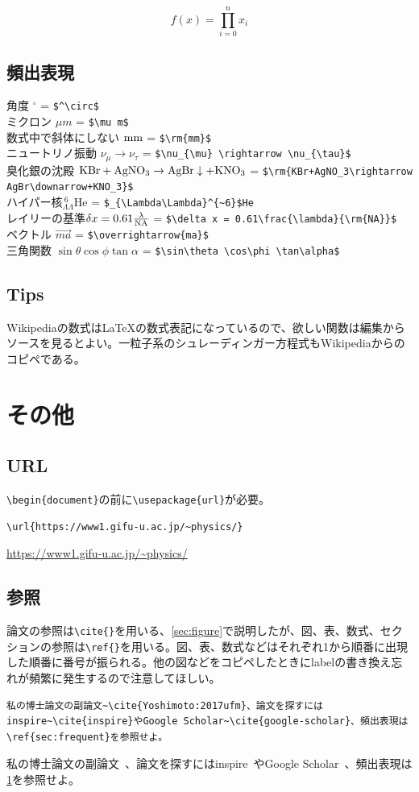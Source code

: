 \documentclass[a4j,openany,11px]{jsbook}
\begin{document}
\begin{equation}  f(x) = \prod_{i=0}^n x_i \end{equation}
\section{頻出表現}
\label{sec:frequent}
\noindent
角度 $^\circ$ = \verb|$^\circ$|\\
ミクロン $\mu m$ = \verb|$\mu m$|\\
数式中で斜体にしない $\rm{mm}$ = \verb|$\rm{mm}$|\\
ニュートリノ振動 $\nu_{\mu} \rightarrow \nu_{\tau}$ = \verb|$\nu_{\mu} \rightarrow \nu_{\tau}$|\\
臭化銀の沈殿 $\rm{KBr+AgNO_3\rightarrow AgBr\downarrow+KNO_3}$ = \verb|$\rm{KBr+AgNO_3\rightarrow AgBr\downarrow+KNO_3}$|\\
ハイパー核$_{\Lambda\Lambda}^{~6}$He = \verb|$_{\Lambda\Lambda}^{~6}$He|\\
レイリーの基準$\delta x = 0.61\frac{\lambda}{\rm{NA}}$ = \verb|$\delta x = 0.61\frac{\lambda}{\rm{NA}}$|\\
ベクトル $\overrightarrow{ma}$ = \verb|$\overrightarrow{ma}$|\\
三角関数 $\sin\theta \cos\phi \tan\alpha$ = \verb|$\sin\theta \cos\phi \tan\alpha$|

\section{Tips}
Wikipediaの数式は\LaTeX の数式表記になっているので、欲しい関数は編集からソースを見るとよい。一粒子系のシュレーディンガー方程式もWikipediaからのコピペである。

\chapter{その他}
\section{URL}
\verb|\begin{document}|の前に\verb|\usepackage{url}|が必要。
\begin{verbatim}
\url{https://www1.gifu-u.ac.jp/~physics/}
\end{verbatim}
\url{https://www1.gifu-u.ac.jp/~physics/}

\section{参照}
論文の参照は\verb|\cite{}|を用いる、\ref{sec:figure}で説明したが、図、表、数式、セクションの参照は\verb|\ref{}|を用いる。図、表、数式などはそれぞれ1から順番に出現した順番に番号が振られる。他の図などをコピペしたときにlabelの書き換え忘れが頻繁に発生するので注意してほしい。
\begin{verbatim}
私の博士論文の副論文~\cite{Yoshimoto:2017ufm}、論文を探すにはinspire~\cite{inspire}やGoogle Scholar~\cite{google-scholar}、頻出表現は\ref{sec:frequent}を参照せよ。
\end{verbatim}
私の博士論文の副論文~\cite{Yoshimoto:2017ufm}、論文を探すにはinspire~\cite{inspire}やGoogle Scholar~\cite{google-scholar}、頻出表現は\ref{sec:frequent}を参照せよ。
\end{document}
